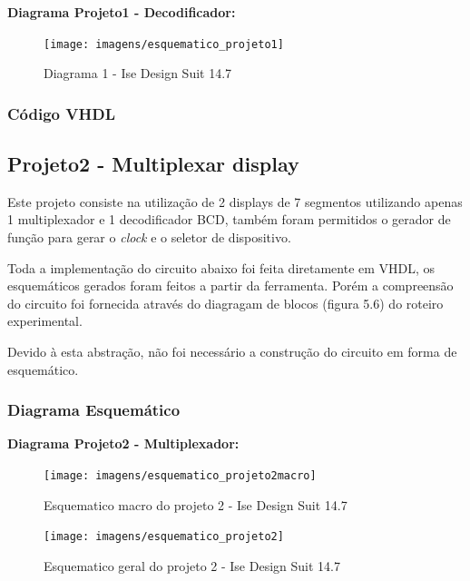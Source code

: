 \documentclass[12pts]{article}
\begin{document}
\textbf{Diagrama Projeto1 - Decodificador:}

\begin{figure}[!htb]
  \centering
  \texttt{[image: imagens/esquematico\_projeto1]}
  \caption{Diagrama 1 - Ise Design Suit 14.7}
  \label{figRotulo}
\end{figure}

\newpage
\subsubsection{Código VHDL}



\clearpage

\subsection{Projeto2 - Multiplexar display}

	Este projeto consiste na utilização de 2 displays de 7 segmentos utilizando apenas 1 multiplexador e 1 decodificador BCD, também foram permitidos o gerador de função para gerar o \textit{clock} e o seletor de dispositivo.
	
	Toda a implementação do circuito abaixo foi feita diretamente em VHDL, os esquemáticos gerados foram feitos a partir da ferramenta. Porém a compreensão do circuito foi fornecida através do diagragam de blocos (figura 5.6) do roteiro experimental.
	
	Devido à esta abstração, não foi necessário a construção do circuito em forma de esquemático.

\subsubsection{Diagrama Esquemático}

\textbf{Diagrama Projeto2 - Multiplexador:}

\begin{figure}[!htb]
  \centering
  \texttt{[image: imagens/esquematico\_projeto2macro]}
  \caption{Esquematico macro do projeto 2 - Ise Design Suit 14.7}
  \label{figRotulo}
\end{figure}

\clearpage

\begin{figure}[!htb]
  \centering
  \texttt{[image: imagens/esquematico\_projeto2]}
  \caption{Esquematico geral do projeto 2 - Ise Design Suit 14.7}
  \label{figRotulo}
\end{figure}
\end{document}
